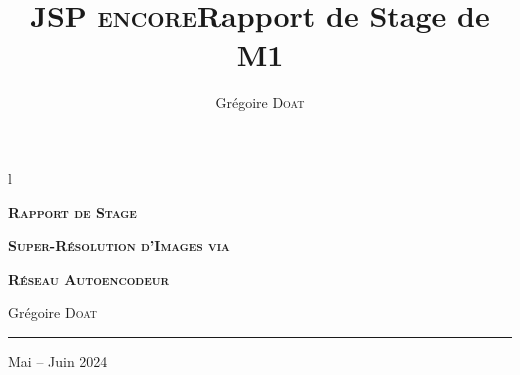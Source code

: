 \documentclass[hidelinks, french]{article} %
\title{\textbf{\textsc{JSP encore}\newline Rapport de Stage de M1}}
\author{}
\date{Grégoire \textsc{Doat}}
\theoremstyle{enonce}
\theoremstyle{special}
\theoremstyle{rq}
\theoremstyle{exo}
\theoremstyle{demo}
\begin{document}
\captionsetup{labelformat=custom, labelsep=custom}

\begin{titlepage}\centering
	{\color{white}l}

	\vspace{1cm}
	
	{\Large\textbf{\textsc{Rapport de Stage}}}
 
    \vspace{1.5cm}
    
	{\huge\scshape\textbf{Super-Résolution d'Images via}}
 
    \vspace{0.2cm}
    
    {\huge\scshape\textbf{Réseau Autoencodeur}}
    
	\vspace{1.5cm}
 
	{\large Grégoire \textsc{Doat}}\par
 
	\vspace{0.5cm}
 

     \vspace{0.5cm}
 
	\rule{10cm}{0.3pt}\par
 
	\vspace{0.7cm}
    {\large Mai -- Juin 2024}

    
    \vfill
    \tableofcontents

    



	\vspace{0.5cm}

\end{titlepage}

\end{document}
